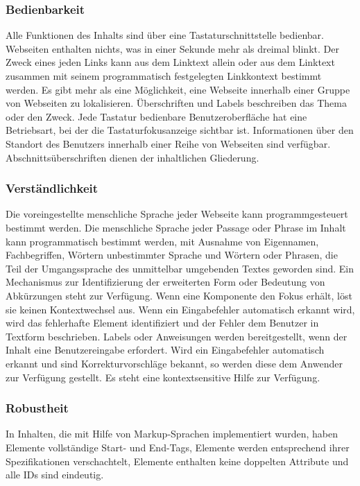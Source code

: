 \subsubsection*{Bedienbarkeit}
Alle Funktionen des Inhalts sind über eine Tastaturschnittstelle bedienbar.
Webseiten enthalten nichts, was in einer Sekunde mehr als dreimal blinkt.
Der Zweck eines jeden Links kann aus dem Linktext allein oder aus dem Linktext zusammen mit seinem programmatisch festgelegten Linkkontext bestimmt werden. Es gibt mehr als eine Möglichkeit, eine Webseite innerhalb einer Gruppe von Webseiten zu lokalisieren. Überschriften und Labels beschreiben das Thema oder den Zweck. Jede Tastatur bedienbare Benutzeroberfläche hat eine Betriebsart, bei der die Tastaturfokusanzeige sichtbar ist. Informationen über den Standort des Benutzers innerhalb einer Reihe von Webseiten sind verfügbar. Abschnittsüberschriften dienen der inhaltlichen Gliederung.



\subsubsection*{Verständlichkeit}

Die voreingestellte menschliche Sprache jeder Webseite kann programmgesteuert bestimmt werden. Die menschliche Sprache jeder Passage oder Phrase im Inhalt kann programmatisch bestimmt werden, mit Ausnahme von Eigennamen, Fachbegriffen, Wörtern unbestimmter Sprache und Wörtern oder Phrasen, die Teil der Umgangssprache des unmittelbar umgebenden Textes geworden sind. Ein Mechanismus zur Identifizierung der erweiterten Form oder Bedeutung von Abkürzungen steht zur Verfügung.  Wenn eine Komponente den Fokus erhält, löst sie keinen Kontextwechsel aus. Wenn ein Eingabefehler automatisch erkannt wird, wird das fehlerhafte Element identifiziert und der Fehler dem Benutzer in Textform beschrieben. Labels oder Anweisungen werden bereitgestellt, wenn der Inhalt eine Benutzereingabe erfordert.  Wird ein Eingabefehler automatisch erkannt und sind Korrekturvorschläge bekannt, so werden diese dem Anwender zur Verfügung gestellt.  Es steht eine kontextsensitive Hilfe zur Verfügung.



\subsubsection*{Robustheit}
 In Inhalten, die mit Hilfe von Markup-Sprachen implementiert wurden, haben Elemente vollständige Start- und End-Tags, Elemente werden entsprechend ihrer Spezifikationen verschachtelt, Elemente enthalten keine doppelten Attribute und alle IDs sind eindeutig.
